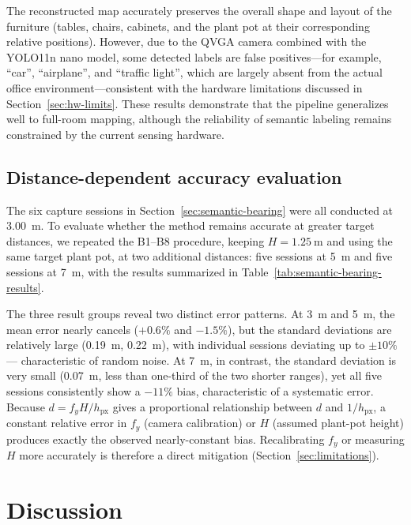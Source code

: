 \documentclass[conference]{IEEEtran}
\begin{document}
The reconstructed map accurately preserves the overall shape and layout of the furniture (tables, chairs, cabinets, and the plant pot at their corresponding relative positions). However, due to the QVGA camera combined with the YOLO11n nano model, some detected labels are false positives—for example, ``car'', ``airplane'', and ``traffic light'', which are largely absent from the actual office environment—consistent with the hardware limitations discussed in Section~\ref{sec:hw-limits}. These results demonstrate that the pipeline generalizes well to full-room mapping, although the reliability of semantic labeling remains constrained by the current sensing hardware.

\subsection{Distance-dependent accuracy evaluation}
\label{sec:distance-eval}

The six capture sessions in Section~\ref{sec:semantic-bearing} were all conducted at \SI{3.00}{\meter}. To evaluate whether the method remains accurate at greater target distances, we repeated the B1--B8 procedure, keeping $H=\SI{1.25}{\meter}$ and using the same target plant pot, at two additional distances: five sessions at \SI{5}{\meter} and five sessions at \SI{7}{\meter}, with the results summarized in Table~\ref{tab:semantic-bearing-results}.

The three result groups reveal two distinct error patterns. At \SI{3}{\meter} and \SI{5}{\meter}, the mean error nearly cancels ($+0.6\%$ and $-1.5\%$), but the standard deviations are relatively large (\SI{0.19}{\meter}, \SI{0.22}{\meter}), with individual sessions deviating up to $\pm 10\%$ — characteristic of random noise. At \SI{7}{\meter}, in contrast, the standard deviation is very small (\SI{0.07}{\meter}, less than one-third of the two shorter ranges), yet all five sessions consistently show a $-11\%$ bias, characteristic of a systematic error. Because $d = f_y H / h_{\text{px}}$ gives a proportional relationship between $d$ and $1/h_{\text{px}}$, a constant relative error in $f_y$ (camera calibration) or $H$ (assumed plant-pot height) produces exactly the observed nearly-constant bias. Recalibrating $f_y$ or measuring $H$ more accurately is therefore a direct mitigation (Section~\ref{sec:limitations}).

\section{Discussion}
\end{document}
